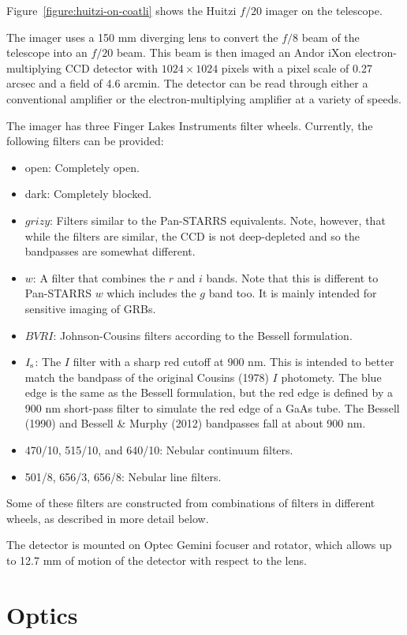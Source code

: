 Figure~\ref{figure:huitzi-on-coatli} shows the Huitzi $f/20$ imager on the telescope.

The imager uses a 150 mm diverging lens to convert the $f/8$ beam of the telescope into an $f/20$ beam. This beam is then imaged an Andor iXon electron-multiplying CCD detector with $1024\times1024$ pixels with a pixel scale of 0.27 arcsec and a field of 4.6 arcmin. The detector can be read through either a conventional amplifier or the electron-multiplying amplifier at a variety of speeds.

The imager has three Finger Lakes Instruments filter wheels. Currently, the following filters can be provided:

\begin{itemize}
\item open: Completely open.
\item dark: Completely blocked.
\item $grizy$: Filters similar to the Pan-STARRS equivalents. Note, however, that while the filters are similar, the CCD is not deep-depleted and so the bandpasses are somewhat different.
\item $w$: A filter that combines the $r$ and $i$ bands. Note that this is different to Pan-STARRS $w$ which includes the $g$ band too. It is mainly intended for sensitive imaging of GRBs.
\item $BVRI$: Johnson-Cousins filters according to the Bessell formulation.
\item $\mbox{$I_\mathrm{s}$}$: The $I$ filter with a sharp red cutoff at 900 nm. This is intended to better match the bandpass of the original Cousins (1978) $I$ photomety. The blue edge is the same as the Bessell formulation, but the red edge is defined by a 900 nm short-pass filter to simulate the red edge of a GaAs tube. The Bessell (1990) and Bessell \& Murphy (2012) bandpasses fall at about 900 nm.
\item 470/10, 515/10, and 640/10: Nebular continuum filters.
\item 501/8, 656/3, 656/8: Nebular line filters.
\end{itemize}

Some of these filters are constructed from combinations of filters in different wheels, as described in more detail below.

The detector is mounted on Optec Gemini focuser and rotator, which allows up to 12.7 mm of motion of the detector with respect to the lens.

\section{Optics}

